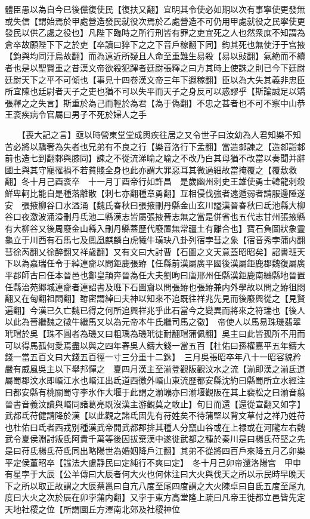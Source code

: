 體臣愚以為自今已後儻復使民【復扶又翻】宜明其令使必如期以次有事寧使更發無或失信【謂始焉於甲處營造發民就役次焉於乙處營造不可仍用甲處就役之民寧使更發民以供乙處之役也】凡陛下臨時之所行刑皆有罪之吏宜死之人也然衆庶不知謂為倉卒故願陛下下之於吏【卒讀曰猝下之之下音戶稼翻下同】鈞其死也無使汙于宫掖【鈞與均同汙烏故翻】而為遠近所疑且人命至重難生易殺【易以䜴翻】氣絶而不續者也是以聖賢重之昔漢文帝欲殺犯蹕者廷尉張釋之曰方其時上使誅之則已今下廷尉廷尉天下之平不可傾也【事見十四卷漢文帝三年下遐稼翻】臣以為大失其義非忠臣所宜陳也廷尉者天子之吏也猶不可以失平而天子之身反可以惑謬乎【斯論誠足以矯張釋之之失言】斯重於為己而輕於為君【為于偽翻】不忠之甚者也不可不察中山恭王衮疾病令官屬曰男子不死於婦人之手

　　【喪大記之言】亟以時營東堂堂成輿疾往居之又令世子曰汝幼為人君知樂不知苦必將以驕奢為失者也兄弟有不良之行【樂音洛行下孟翻】當造䣛諫之【造䣛詣䣛前也造七到翻䣛與膝同】諫之不從流涕喻之喻之不改乃白其母猶不改當以奏聞并辭國土與其守寵罹禍不若貧賤全身也此亦謂大罪惡耳其微過細故當掩覆之【覆敷救翻】冬十月己酉衮卒　十一月丁酉帝行如許昌　是歲幽州刺史王雄使勇士韓龍刺殺鮮卑軻比能自是種落離散【刺七亦翻種章勇翻】互相侵伐強者遠遁弱者請服邊陲遂安　張掖柳谷口水溢涌【魏氏春秋曰張掖刪丹縣金山玄川謚漢晉春秋曰氐池縣大柳谷口夜激波涌溢刪丹氐池二縣漢志皆屬張掖晉志無之當是併省也五代志甘州張掖縣有大柳谷又後周廢金山縣入刪丹縣蓋歷代廢置無常疆土有離合也】寶石負圖狀象靈龜立于川西有石馬七及鳳凰麒麟白虎犧牛璜玦八卦列宿孛彗之象【宿音秀孛蒲内翻彗徐芮翻乂徐醉翻又祥歲翻】又有文曰大討曹【石圖之文天意蓋昭昭矣】詔書班天下以為嘉瑞任令于綽連齎以問鉅鹿張臶【任縣前漢屬廣平國後漢屬鉅鹿郡魏復屬廣平郡師古曰任本晉邑也鄭皇頡奔晉為任大夫劉昫曰唐邢州任縣漢鉅鹿南䜌縣地晉置任縣治苑郷城連齎者連詔書及班下石圖齎以問張臶也張臶兼内外學故以問之臶徂悶翻又在甸翻祖悶翻】臶密謂綽曰夫神以知來不追既往祥兆先見而後廢興從之【見賢遍翻】今漢已久亡魏已得之何所追興祥兆乎此石當今之變異而將來之符瑞也【後人以此為晉繼魏之徵牛繼馬又以為元帝本牛氏繼司馬之徵】　帝使人以馬易珠璣翡翠玳瑁於吳【珠不圓者為璣又曰粗瑀為璣玳徒耐翻瑁蒲佩翻】吳主曰此皆孤所不用而可以得馬孤何愛焉盡以與之四年春吳人鑄大錢一當五百【杜佑曰孫權嘉平五年鑄大錢一當五百文曰大錢五百徑一寸三分重十二銖】　三月吳張昭卒年八十一昭容貌矜嚴有威風吳主以下舉邦憚之　夏四月漢主至湔登觀阪觀汶水之流【湔即漢之湔氐道屬蜀郡汶水即㟭江水也㟭江出氐道西徼外㟭山東流歷都安縣沈約曰縣蜀所立水經注曰都安縣有桃關蜀守李氷作大堰于此謂之湔塴亦曰湔堰觀阪在其上裴松之曰湔音翦晉書音義汶讀與㟭同諸葛亮既沒漢主游觀莫之敢止】旬日而還【還從宣翻又如字】　武都氐苻健請降於漢【以此觀之諸氐固先有苻姓矣不待蒲堅以背文草付之祥乃姓苻也杜佑曰氐者西戎别種漢武帝開武都郡排其種人分竄山谷或在上禄或在河隴左右魏武令夏侯淵討叛氐阿貴千萬等後因拔棄漢中遂徙武都之種於秦川是曰楊氐苻堅之先是曰苻氐楊氐苻氐同出略陽世為婚姻降戶江翻】其弟不從將四百戶來降五月乙卯樂平定侯董昭卒【諡法大慮静民曰定純行不爽曰定】　冬十月己卯帝還洛陽宫　甲申有星孛于大辰【公羊傳曰大辰者何大火也何休注曰大火與伐天之所以示民時早晚天下之所以取正故謂之大辰蔡邕曰自亢八度至尾四度謂之大火陳卓曰自氐五度至尾九度曰大火之次於辰在卯孛蒲内翻】又孛于東方高堂隆上疏曰凡帝王徙都立邑皆先定天地社稷之位【所謂圜丘方澤南北郊及社稷神位